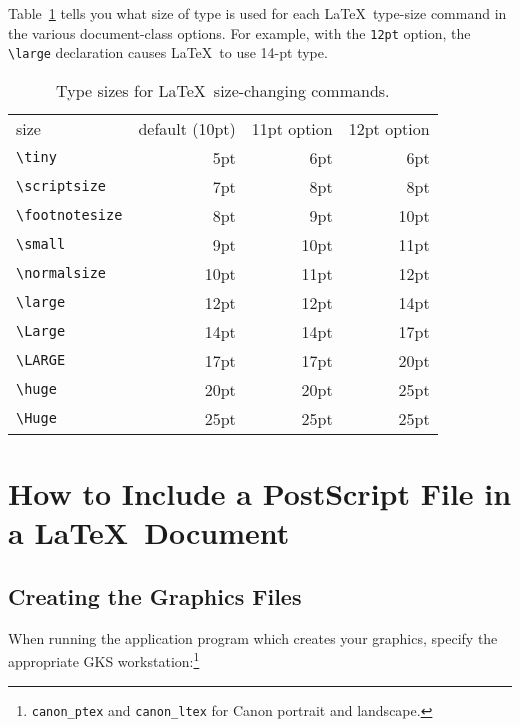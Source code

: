 \documentclass[11pt,twoside]{article}
\newcommand{\xlabel}[1]{}
\begin{document}
Table~\ref{tab:styles} tells you what size of type is used for each
\LaTeX\ type-size command in the various document-class options.  For
example, with the \texttt{12pt} option, the \hbox{\verb|\large|}
declaration causes \LaTeX\ to use 14-pt type.

\begin{table}[htb]
\centering
\begin{tabular}{l|r|r|r|}
\multicolumn{1}{l}{size} &
\multicolumn{1}{c}{default (10pt)} &
        \multicolumn{1}{c}{11pt option}  &
        \multicolumn{1}{c}{12pt option}\\
\cline{2-4}
\verb|\tiny|       & 5pt  & 6pt & 6pt\\
\cline{2-4}
\verb|\scriptsize| & 7pt  & 8pt & 8pt\\
\cline{2-4}
\verb|\footnotesize| & 8pt & 9pt & 10pt\\
\cline{2-4}
\verb|\small|      & 9pt  & 10pt & 11pt\\
\cline{2-4}
\verb|\normalsize| & 10pt & 11pt & 12pt \\
\cline{2-4}
\verb|\large|      & 12pt & 12pt & 14pt \\
\cline{2-4}
\verb|\Large|      & 14pt & 14pt & 17pt \\
\cline{2-4}
\verb|\LARGE|      & 17pt & 17pt & 20pt\\
\cline{2-4}
\verb|\huge|       & 20pt & 20pt & 25pt\\
\cline{2-4}
\verb|\Huge|       & 25pt & 25pt & 25pt\\
\cline{2-4}
\end{tabular}
\caption{Type sizes for \LaTeX\ size-changing commands.}\label{tab:styles}
\end{table}


\section{\xlabel{including_ps_in_latex}\label{including_ps_in_latex}
How to Include a PostScript File in a \LaTeX\ Document}

\subsection{\xlabel{creating_the_graphics_files}Creating the Graphics Files}

When running the application program which creates your graphics,
specify the appropriate GKS workstation:\footnote{\texttt{canon\_ptex} and
\texttt{canon\_ltex} for Canon portrait and landscape.}
\end{document}
